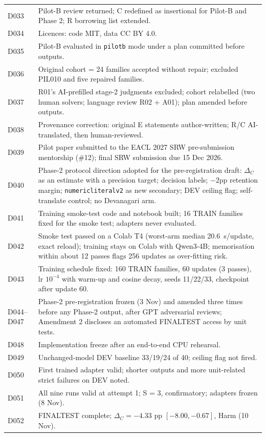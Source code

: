 \documentclass[12pt,a4paper,oneside]{report}
\renewcommand{\_}{\oldunderscore\allowbreak}
\begin{document}
\begin{longtable}{@{}p{1.2cm}p{12.3cm}@{}}
D033 & Pilot-B review returned; C redefined as insertional for Pilot-B and Phase 2; R borrowing list extended.\\
D034 & Licences: code MIT, data CC BY 4.0.\\
D035 & Pilot-B evaluated in \texttt{pilot\_b} mode under a plan committed before outputs.\\
D036 & Original cohort = 24 families accepted without repair; excluded PIL010 and five repaired families.\\
D037 & R01's AI-prefilled stage-2 judgments excluded; cohort relabelled (two human solvers; language review R02 + A01); plan amended before outputs.\\
D038 & Provenance correction: original E statements author-written; R/C AI-translated, then human-reviewed.\\
D039 & Pilot paper submitted to the EACL 2027 SRW pre-submission mentorship (\#12); final SRW submission due 15 Dec 2026.\\
D040 & Phase-2 protocol direction adopted for the pre-registration draft: $\Delta_C$ as an estimate with a precision target; decision labels; $-$2pp retention margin; \texttt{numeric\_literal\_v2} as new secondary; DEV ceiling flag; self-translate control; no Devanagari arm.\\
D041 & Training smoke-test code and notebook built; 16 TRAIN families fixed for the smoke test; adapters never evaluated.\\
D042 & Smoke test passed on a Colab T4 (worst-arm median 20.6~s/update, exact reload); training stays on Colab with Qwen3-4B; memorisation within about 12 passes flags 256 updates as over-fitting risk.\\
D043 & Training schedule fixed: 160 TRAIN families, 60 updates (3 passes), lr $10^{-4}$ with warm-up and cosine decay, seeds 11/22/33, checkpoint after update 60.\\
D044--D047 & Phase-2 pre-registration frozen (3 Nov) and amended three times before any Phase-2 output, after GPT adversarial reviews; Amendment 2 discloses an automated FINAL\_TEST access by unit tests.\\
D048 & Implementation freeze after an end-to-end CPU rehearsal.\\
D049 & Unchanged-model DEV baseline 33/19/24 of 40; ceiling flag not fired.\\
D050 & First trained adapter valid; shorter outputs and more unit-related strict failures on DEV noted.\\
D051 & All nine runs valid at attempt 1; S = 3, confirmatory; adapters frozen (8 Nov).\\
D052 & FINAL\_TEST complete; $\Delta_C = -4.33$ pp $[-8.00, -0.67]$, Harm (10 Nov).\\
\bottomrule
\end{longtable}
\end{document}

